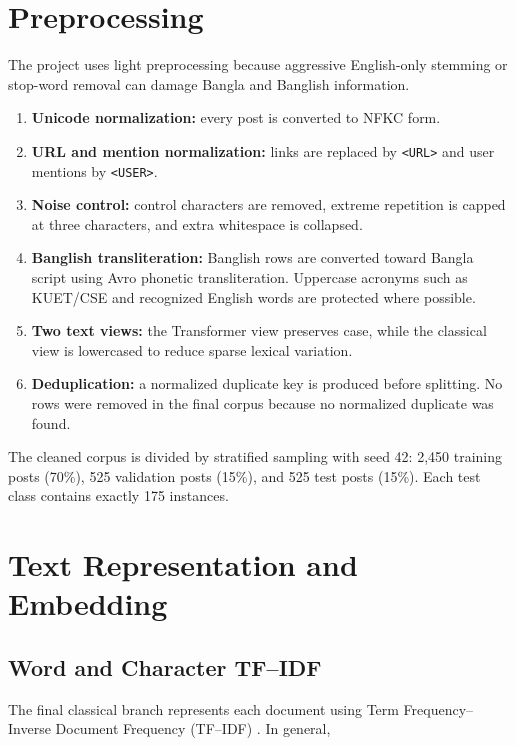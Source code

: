 \documentclass[12pt,a4paper]{report}
\begin{document}
\section{Preprocessing}
The project uses light preprocessing because aggressive English-only
stemming or stop-word removal can damage Bangla and Banglish information.

\begin{enumerate}
    \item \textbf{Unicode normalization:} every post is converted to NFKC
    form.
    \item \textbf{URL and mention normalization:} links are replaced by
    \texttt{<URL>} and user mentions by \texttt{<USER>}.
    \item \textbf{Noise control:} control characters are removed, extreme
    repetition is capped at three characters, and extra whitespace is
    collapsed.
    \item \textbf{Banglish transliteration:} Banglish rows are converted
    toward Bangla script using Avro phonetic transliteration. Uppercase
    acronyms such as KUET/CSE and recognized English words are protected
    where possible.
    \item \textbf{Two text views:} the Transformer view preserves case,
    while the classical view is lowercased to reduce sparse lexical
    variation.
    \item \textbf{Deduplication:} a normalized duplicate key is produced
    before splitting. No rows were removed in the final corpus because no
    normalized duplicate was found.
\end{enumerate}

The cleaned corpus is divided by stratified sampling with seed 42:
2,450 training posts (70\%), 525 validation posts (15\%), and 525 test posts
(15\%). Each test class contains exactly 175 instances.

\section{Text Representation and Embedding}

\subsection{Word and Character TF--IDF}
The final classical branch represents each document using
Term Frequency--Inverse Document Frequency (TF--IDF) \cite{salton}. In
general,
\end{document}
